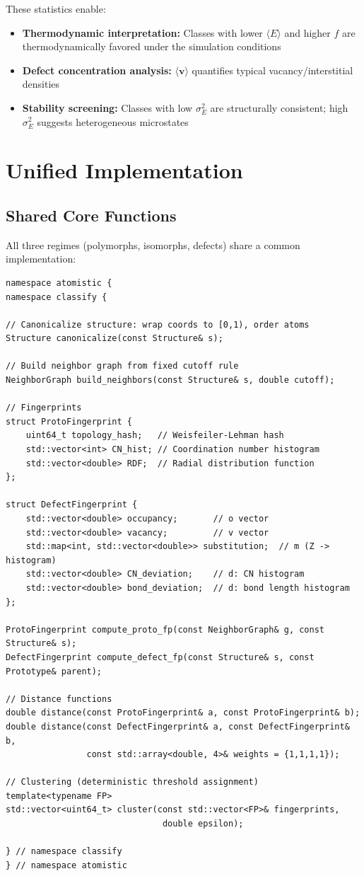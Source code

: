 \documentclass[11pt]{article}
\begin{document}
These statistics enable:
\begin{itemize}
  \item \textbf{Thermodynamic interpretation:} Classes with lower $\langle E \rangle$
        and higher $f$ are thermodynamically favored under the simulation conditions
  \item \textbf{Defect concentration analysis:} $\langle \mathbf{v} \rangle$ quantifies
        typical vacancy/interstitial densities
  \item \textbf{Stability screening:} Classes with low $\sigma_E^2$ are
        structurally consistent; high $\sigma_E^2$ suggests heterogeneous microstates
\end{itemize}

\section{Unified Implementation}

\subsection{Shared Core Functions}

All three regimes (polymorphs, isomorphs, defects) share a common implementation:

\begin{lstlisting}[caption={Unified Clustering Core (C++20)}, label=lst:unified-core]
namespace atomistic {
namespace classify {

// Canonicalize structure: wrap coords to [0,1), order atoms
Structure canonicalize(const Structure& s);

// Build neighbor graph from fixed cutoff rule
NeighborGraph build_neighbors(const Structure& s, double cutoff);

// Fingerprints
struct ProtoFingerprint {
    uint64_t topology_hash;   // Weisfeiler-Lehman hash
    std::vector<int> CN_hist; // Coordination number histogram
    std::vector<double> RDF;  // Radial distribution function
};

struct DefectFingerprint {
    std::vector<double> occupancy;       // o vector
    std::vector<double> vacancy;         // v vector
    std::map<int, std::vector<double>> substitution;  // m (Z -> histogram)
    std::vector<double> CN_deviation;    // d: CN histogram
    std::vector<double> bond_deviation;  // d: bond length histogram
};

ProtoFingerprint compute_proto_fp(const NeighborGraph& g, const Structure& s);
DefectFingerprint compute_defect_fp(const Structure& s, const Prototype& parent);

// Distance functions
double distance(const ProtoFingerprint& a, const ProtoFingerprint& b);
double distance(const DefectFingerprint& a, const DefectFingerprint& b,
                const std::array<double, 4>& weights = {1,1,1,1});

// Clustering (deterministic threshold assignment)
template<typename FP>
std::vector<uint64_t> cluster(const std::vector<FP>& fingerprints,
                               double epsilon);

} // namespace classify
} // namespace atomistic
\end{lstlisting}
\end{document}
